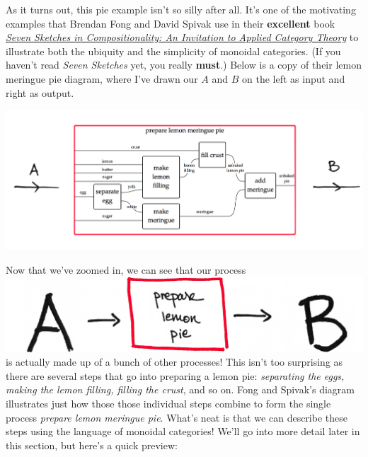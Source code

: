 \documentclass{tufte-handout-tai}
\theoremstyle{plain}
\theoremstyle{definition}
\theoremstyle{remark}
\begin{document}
As it turns out, this pie example isn't so silly after all. It's one of the motivating examples that Brendan Fong and David Spivak use in their \textbf{excellent} book \href{https://arxiv.org/pdf/1803.05316.pdf}{\textit{Seven Sketches in Compositionality: An Invitation to Applied Category Theory}} to illustrate both the ubiquity and the simplicity of monoidal categories. (If you haven't read \textit{Seven Sketches} yet, you really \textbf{must}.) Below is a copy of their lemon meringue pie diagram, where I've drawn our $A$ and $B$ on the left as input and right as output.
\begin{fullwidth}
\begin{center}
\includegraphics[width=!,totalheight=!,scale=0.5]{pie.png}
\end{center}
\end{fullwidth}
Now that we've zoomed in, we can see that our process {\includegraphics[width=!,totalheight=!,scale=0.11]{pie3.png}} is actually made up of a bunch of other processes! This isn't too surprising as there are several steps that go into preparing a lemon pie: \textit{separating the eggs, making the lemon filling, filling the crust}, and so on. Fong and Spivak's diagram illustrates just how those those individual steps combine to form the single process \textit{prepare lemon meringue pie}. What's neat is that we can describe these steps using the language of monoidal categories! We'll go into more detail later in this section, but here's a quick preview:
\end{document}
